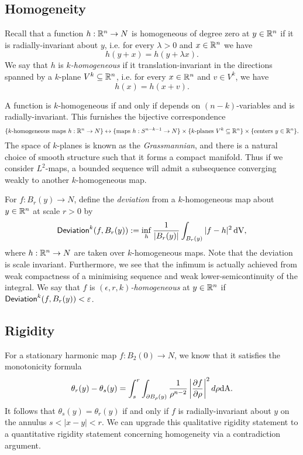 \subsection{Homogeneity}

Recall that a function $h: \mathbb R^n \to N$ is homogeneous of degree zero at $y \in \mathbb R^n$ if it is radially-invariant about $y$, i.e. for every $\lambda > 0$ and $x \in \mathbb R^n$ we have
	\[ h(y + x) = h(y + \lambda x). \]
We say that $h$ is \emph{$k$-homogeneous} if it translation-invariant in the directions spanned by a $k$-plane $V^k \subseteq \mathbb R^n$, i.e. for every $x \in \mathbb R^n$ and $v \in V^k$, we have
	\[ h(x) = h(x + v). \]
\begin{remark}
	A function is $k$-homogeneous if and only if depends on $(n - k)$-variables and is radially-invariant. This furnishes the bijective correspondence 
		\[\{ \text{$k$-homogeneous maps $h: \mathbb R^n \to N$} \}\leftrightarrow \{ \text{maps $h: S^{n - k - 1} \to N$}\} \times \{ \text{$k$-planes $V^k \subseteq \mathbb R^n$} \} \times \{ \text{centers $y \in \mathbb R^n$} \}. \]
	The space of $k$-planes is known as the \textit{Grassmannian}, and there is a natural choice of smooth structure such that it forms a compact manifold. Thus if we consider $L^2$-maps, a bounded sequence will admit a subsequence converging weakly to another $k$-homogeneous map.  	
\end{remark}	
	

For $f : B_r (y) \to N$, define the \emph{deviation} from a $k$-homogeneous map about $y \in \mathbb R^n$ at scale $r > 0$ by  
	\[ \mathsf{Deviation}^{k} (f, B_r (y)) := \inf_h \frac{1}{|B_r (y)|} \int_{B_r (y)} |f - h|^2 \, \mathrm{dV} , \]
where $h : \mathbb R^n \to N$ are taken over $k$-homogeneous maps. Note that the deviation is scale invariant. Furthermore, we see that the infimum is actually achieved from weak compactness of a minimising sequence and weak lower-semicontinuity of the integral. We say that $f$ is \emph{$(\epsilon, r, k)$-homogeneous} at $y \in \mathbb R^n$ if $\mathsf{Deviation}^k (f, B_r (y)) < \varepsilon$. 

\subsection{Rigidity}

For a stationary harmonic map $f: B_2 (0) \to N$, we know that it satisfies the monotonicity formula
	\[ \theta_r (y) - \theta_s (y) = \int_s^r \int_{\partial B_\rho (y)} \frac{1}{\rho^{n - 2}} \left| \frac{\partial f}{\partial \rho} \right|^2 d\rho \mathrm{dA}. \]	
It follows that $\theta_s (y) = \theta_r (y)$ if and only if $f$ is radially-invariant about $y$ on the annulus $s < |x - y| < r$. We can upgrade this qualitative rigidity statement to a quantitative rigidity statement concerning homogeneity via a contradiction argument. 


